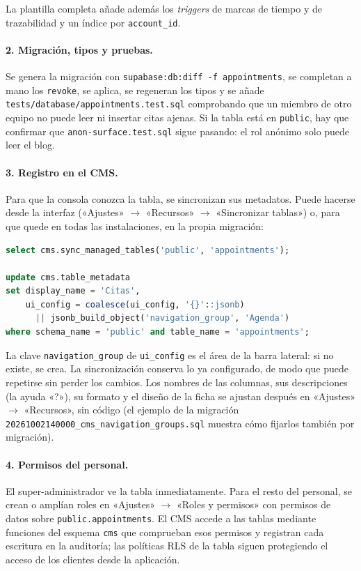 La plantilla completa añade además los \textit{triggers} de marcas de tiempo y
de trazabilidad y un índice por \texttt{account\_id}.

\paragraph{2. Migración, tipos y pruebas.} Se genera la migración con
\texttt{supabase:db:diff -f appointments}, se completan a mano los
\texttt{revoke}, se aplica, se regeneran los tipos y se añade
\texttt{tests/database/appointments.test.sql} comprobando que un miembro de
otro equipo no puede leer ni insertar citas ajenas. Si la tabla está en
\texttt{public}, hay que confirmar que \texttt{anon-surface.test.sql} sigue
pasando: el rol anónimo solo puede leer el blog.

\paragraph{3. Registro en el CMS.} Para que la consola conozca la tabla, se
sincronizan sus metadatos. Puede hacerse desde la interfaz («Ajustes»
$\rightarrow$ «Recursos» $\rightarrow$ «Sincronizar tablas») o, para que
quede en todas las instalaciones, en la propia migración:

\begin{lstlisting}[language=SQL]
select cms.sync_managed_tables('public', 'appointments');

update cms.table_metadata
set display_name = 'Citas',
    ui_config = coalesce(ui_config, '{}'::jsonb)
      || jsonb_build_object('navigation_group', 'Agenda')
where schema_name = 'public' and table_name = 'appointments';
\end{lstlisting}

La clave \texttt{navigation\_group} de \texttt{ui\_config} es el área de la
barra lateral: si no existe, se crea. La sincronización conserva lo ya
configurado, de modo que puede repetirse sin perder los cambios. Los nombres
de las columnas, sus descripciones (la ayuda «?»), su formato y el diseño de
la ficha se ajustan después en «Ajustes» $\rightarrow$ «Recursos», sin código
(el ejemplo de la migración \texttt{20261002140000\_cms\_navigation\_groups.sql}
muestra cómo fijarlos también por migración).

\paragraph{4. Permisos del personal.} El super-administrador ve la tabla
inmediatamente. Para el resto del personal, se crean o amplían roles en
«Ajustes» $\rightarrow$ «Roles y permisos» con permisos de datos sobre
\texttt{public.appointments}. El CMS accede a las tablas mediante funciones
del esquema \texttt{cms} que comprueban esos permisos y registran cada escritura
en la auditoría; las políticas RLS de la tabla siguen protegiendo el acceso de
los clientes desde la aplicación.

